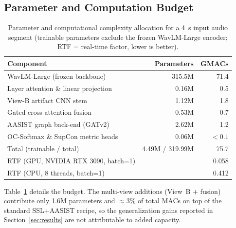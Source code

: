 \subsection{Parameter and Computation Budget}
\label{ssec:budget}

\begin{table}[t]
\centering
\caption{Parameter and computational complexity allocation for a 4~s input audio segment (trainable parameters exclude the frozen WavLM-Large encoder; RTF = real-time factor, lower is better).}
\label{tab:budget}
\footnotesize
\setlength{\tabcolsep}{3.5pt}
\begin{tabular}{lrr}
\toprule
Component & Parameters & GMACs \\
\midrule
WavLM-Large (frozen backbone)       & 315.5M & 71.4 \\
Layer attention \& linear projection & 0.16M  & 0.5  \\
View-B artifact CNN stem            & 1.12M  & 1.8  \\
Gated cross-attention fusion        & 0.53M  & 0.7  \\
AASIST graph back-end (GATv2)       & 2.62M  & 1.2  \\
OC-Softmax \& SupCon metric heads   & 0.06M  & $<0.1$ \\
\midrule
Total (trainable / total)           & 4.49M / 319.99M & 75.7 \\
\midrule
RTF (GPU, NVIDIA RTX 3090, batch=1) & \multicolumn{2}{r}{0.058} \\
RTF (CPU, 8 threads, batch=1)       & \multicolumn{2}{r}{0.412} \\
\bottomrule
\end{tabular}
\end{table}

Table~\ref{tab:budget} details the budget. The multi-view additions (View~B + fusion)
contribute only 1.6M parameters and $\approx$3\% of total MACs on top of the standard
SSL+AASIST recipe, so the generalization gains reported in Section~\ref{sec:results}
are not attributable to added capacity.
